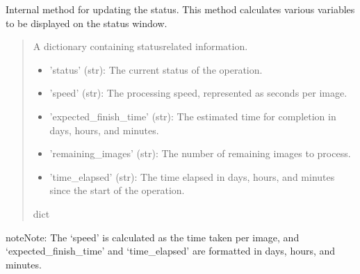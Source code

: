 \documentclass[letterpaper,10pt,english]{sphinxmanual}
\begin{document}
\begin{fulllineitems}
\label{\detokenize{index:gebot.ImageDownloader.__get_status__}}
\pysigstartsignatures
{}
\pysigstopsignatures
\sphinxAtStartPar
Internal method for updating the status. This method calculates various variables to be displayed on the status window.
\begin{quote}\begin{description}
\sphinxAtStartPar

\sphinxAtStartPar
A dictionary containing status\sphinxhyphen{}related information.
\begin{itemize}
\item {} 
\sphinxAtStartPar
’status’ (str): The current status of the operation.

\item {} 
\sphinxAtStartPar
’speed’ (str): The processing speed, represented as seconds per image.

\item {} 
\sphinxAtStartPar
’expected\_finish\_time’ (str): The estimated time for completion in days, hours, and minutes.

\item {} 
\sphinxAtStartPar
’remaining\_images’ (str): The number of remaining images to process.

\item {} 
\sphinxAtStartPar
’time\_elapsed’ (str): The time elapsed in days, hours, and minutes since the start of the operation.

\end{itemize}


\sphinxAtStartPar
dict

\end{description}\end{quote}

\begin{sphinxadmonition}{note}{Note:}
\sphinxAtStartPar
The ‘speed’ is calculated as the time taken per image, and ‘expected\_finish\_time’ and ‘time\_elapsed’ are formatted in days, hours, and minutes.
\end{sphinxadmonition}

\end{fulllineitems}

\end{document}
